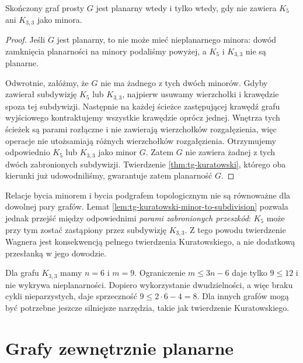 \begin{twierdzenie}
\label{thm:tg-wagner}
Skończony graf prosty $G$ jest planarny wtedy i tylko wtedy,
gdy nie zawiera $K_5$ ani $K_{3,3}$ jako minora.
\end{twierdzenie}

\begin{proof}
Jeśli $G$ jest planarny, to nie może mieć
nieplanarnego minora: dowód zamknięcia planarności
na minory podaliśmy powyżej,
a $K_5$ i $K_{3,3}$ nie są planarne.

Odwrotnie, załóżmy, że $G$ nie ma żadnego
z tych dwóch minorów. Gdyby zawierał
subdywizję $K_5$ lub $K_{3,3}$,
najpierw usuwamy wierzchołki i krawędzie
spoza tej subdywizji. Następnie na każdej ścieżce
zastępującej krawędź grafu wyjściowego
kontraktujemy wszystkie krawędzie oprócz jednej.
Wnętrza tych ścieżek są parami rozłączne
i nie zawierają wierzchołków rozgałęzienia,
więc operacje nie utożsamiają różnych
wierzchołków rozgałęzienia. Otrzymujemy
odpowiednio $K_5$ lub $K_{3,3}$ jako minor $G$.
Zatem $G$ nie zawiera żadnej
z tych dwóch zabronionych subdywizji.
Twierdzenie \ref{thm:tg-kuratowski},
którego oba kierunki już udowodniliśmy,
gwarantuje zatem planarność $G$.
\end{proof}

\begin{uwaga}
Relacje bycia minorem i bycia podgrafem topologicznym
nie są równoważne dla dowolnej pary grafów.
Lemat \ref{lem:tg-kuratowski-minor-to-subdivision}
pozwala jednak przejść między odpowiednimi
\emph{parami zabronionych przeszkód}:
$K_5$ może przy tym zostać zastąpiony
przez subdywizję $K_{3,3}$.
Z tego powodu twierdzenie Wagnera
jest konsekwencją pełnego twierdzenia Kuratowskiego,
a nie dodatkową przesłanką w jego dowodzie.
\end{uwaga}

\begin{przyklad}
Dla grafu $K_{3,3}$ mamy $n=6$ i $m=9$.
Ograniczenie $m\le3n-6$ daje tylko $9\le12$ i nie wykrywa
nieplanarności. Dopiero wykorzystanie dwudzielności,
a więc braku cykli nieparzystych, daje sprzeczność
$9\le2\cdot6-4=8$. Dla innych grafów mogą być potrzebne
jeszcze silniejsze narzędzia, takie jak twierdzenie Kuratowskiego.
\end{przyklad}

\section{Grafy zewnętrznie planarne}
\label{sec:tg-outerplanar}

